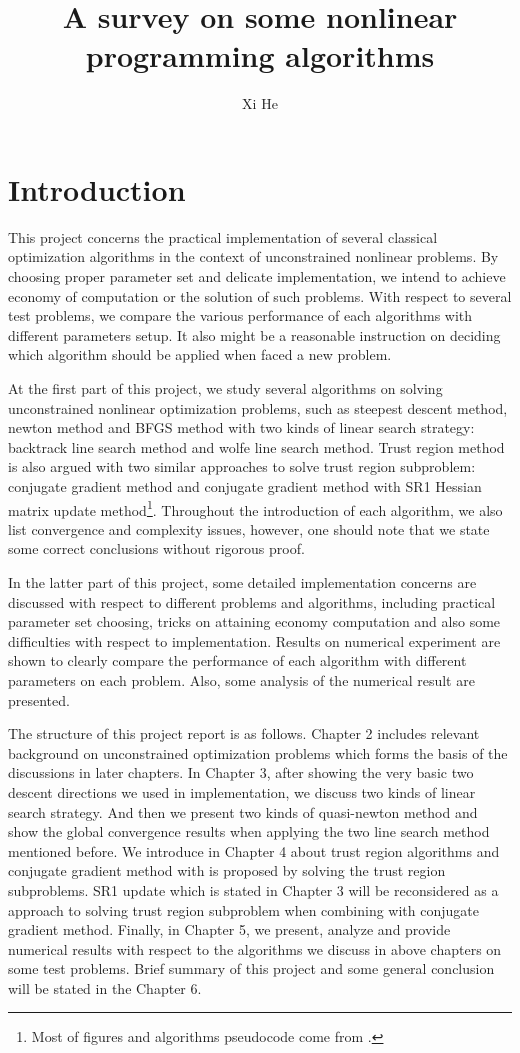 \documentclass[11pt]{report}
\begin{document}
\title {A survey on some nonlinear programming algorithms}
\author{Xi He}

\preface
\chapter{Introduction}

This project concerns the practical implementation of several classical optimization algorithms in the context of unconstrained nonlinear problems. By choosing proper parameter set and delicate implementation, we intend to achieve economy of computation or the solution of such problems. With respect to several test problems, we compare the various performance of each algorithms with different parameters setup. It also might be a reasonable instruction on deciding which algorithm should be applied when faced a new problem.

At the first part of this project, we study several algorithms on solving unconstrained nonlinear optimization problems, such as steepest descent method, newton method and BFGS method with two kinds of linear search strategy: backtrack line search method and wolfe line search method. Trust region method is also argued with two similar approaches to solve trust region subproblem: conjugate gradient method and conjugate gradient method with SR1 Hessian matrix update method\footnote{Most of figures and algorithms pseudocode come from \cite{NoceWrig06}.}. Throughout the introduction of each algorithm, we also list convergence and complexity issues, however, one should note that we state some correct conclusions without rigorous proof.

In the latter part of this project, some detailed implementation concerns are discussed with respect to different problems and algorithms, including practical parameter set choosing, tricks on attaining economy computation and also some difficulties with respect to implementation. Results on numerical experiment are shown to clearly compare the performance of each algorithm with different parameters on each problem. Also, some analysis of the numerical result are presented.

The structure of this project report is as follows. Chapter 2 includes relevant background on unconstrained optimization problems which forms the basis of the discussions in later chapters. In Chapter 3, after showing the very basic two descent directions we used in implementation, we discuss two kinds of linear search strategy. And then we present two kinds of quasi-newton method and show the global convergence results when applying the two line search method mentioned before. We introduce in Chapter 4 about trust region algorithms and conjugate gradient method with is proposed by solving the trust region subproblems. SR1 update which is stated in Chapter 3 will be reconsidered as a approach to solving trust region subproblem when combining with conjugate gradient method. Finally, in Chapter 5, we present, analyze and provide numerical results with respect to the algorithms we discuss in above chapters on some test problems. Brief summary of this project and some general conclusion will be stated in the Chapter 6. 
\end{document}
